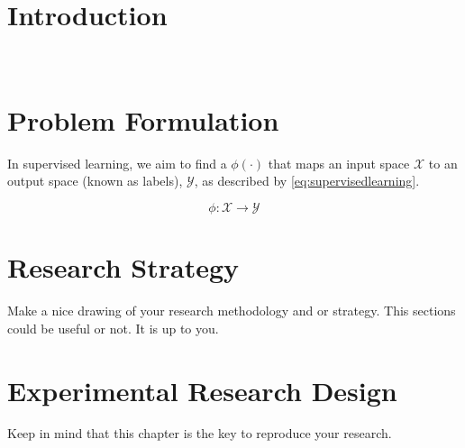 
\section{Introduction}

\lipsum[5]\\


\section{Problem Formulation}
In supervised learning, we aim to find a $\phi(\cdot)$ that maps an input space $\mathcal{X}$ to an output space (known as labels), $\mathcal{Y}$, as described by \eqref{eq:supervisedlearning}.

\begin{equation}
    \phi: \mathbf{\mathcal{X}} \rightarrow \mathcal{Y}    
    \label{eq:supervisedlearning}
\end{equation}

\section{Research Strategy}
Make a nice drawing of your research methodology and or strategy. This sections could be useful or not. It is up to you.

\section{Experimental Research Design}
Keep in mind that this chapter is the key to reproduce your research.\\

\lipsum[5]

